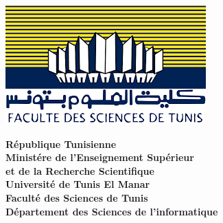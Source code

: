 
\thispagestyle{cover}%
\hspace{-47pt}
\begin{minipage}[l]{0.2\columnwidth}
\vspace{6mm}
\hspace{150mm}\includegraphics[width=1.1\columnwidth]{pages/images/fst en arabe.png}\\
\end{minipage}
\hfill
\begin{minipage}[l]{0.6\columnwidth}
\centering
\footnotesize
\hspace{15mm}\textbf{{République Tunisienne}}\\
\vspace{1.5mm}\hspace{15mm}\textbf{{Ministére de l'Enseignement Supérieur\\
\hspace{15mm}et de la Recherche Scientifique   }}\\
\vspace{1.5mm}
\hspace{15mm}\textbf{{Université de Tunis El Manar }}\\
\vspace{1.5mm}
\hspace{15mm}\textbf{{Faculté des Sciences de Tunis}}\\
\vspace{1.5mm}
\hspace{10mm}\textbf{{Département des Sciences de l'informatique}}
\end{minipage}
\hfill
\begin{minipage}[l]{0.02\columnwidth}
\end{minipage}
\hfill
